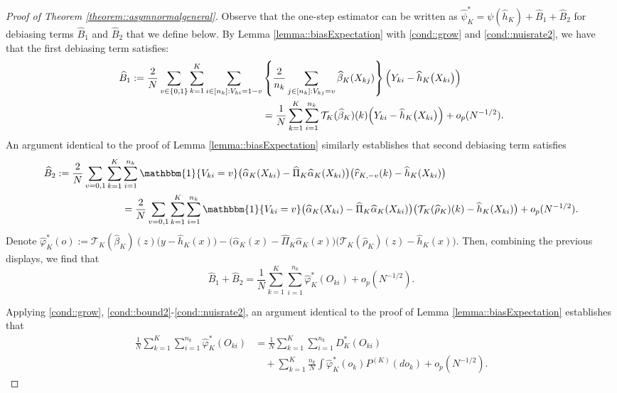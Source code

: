 \documentclass[11pt]{article}
\theoremstyle{plain}
\theoremstyle{definition}
\theoremstyle{remark}
\theoremstyle{definition}
\begin{document}
\begin{proof}[Proof of Theorem  \ref{theorem::asymnormalgeneral}]
 

Observe that the one-step estimator can be written as $\widehat{\psi}_K^* = \psi(\widehat{h}_K) + \widehat{B}_1 + \widehat{B}_2$ for debiasing terms $\widehat{B}_1$ and $\widehat{B}_2$ that we define below. By Lemma \ref{lemma::biasExpectation} with \ref{cond::grow} and \ref{cond::nuisrate2}, we have that the first debiasing term satisfies:
\begin{align*}
        \widehat{B}_1 :=  \frac{2}{N} \sum_{v \in \{0,1\}} \sum_{k=1}^K \sum_{i \in [n_k]: V_{ki} = 1-v} & \left\{\frac{2}{n_k}  \sum_{j \in [n_k]:  V_{kj} = v} \widehat{\beta}_K(X_{kj})\right\}\Bigl(Y_{ki} - \widehat{h}_K\bigl(X_{ki}\bigr)\Bigr)\\
         &=  \frac{1}{N}   \sum_{k=1}^K \sum_{i=1}^{n_k}  \mathcal{T}_{K}(\widehat{\beta}_K)(k) \Bigl(Y_{ki} - \widehat{h}_K\bigl(X_{ki}\bigr)\Bigr) + o_p(N^{-1/2}).
\end{align*} 
An argument identical to the proof of Lemma \ref{lemma::biasExpectation} similarly establishes that second debiasing term satisfies
\begin{align*}
     \widehat{B}_2 :=   \frac{2}{N} \sum_{v=0,1} \sum_{k=1}^K & \sum_{i=1}^{n_k} \mathbbm{1}\{V_{ki} = v\} \bigl(\widehat{\alpha}_K(X_{ki}) - \widehat{\Pi}_K\widehat{\alpha}_K(X_{ki})\bigr) \bigl(\widehat{r}_{K,-v}(k) - \widehat{h}_K(X_{ki})\bigr) \\
    &= \frac{2}{N} \sum_{v=0,1} \sum_{k=1}^K \sum_{i=1}^{n_k} \mathbbm{1}\{V_{ki} = v\} \bigl(\widehat{\alpha}_K(X_{ki}) - \widehat{\Pi}_K\widehat{\alpha}_K(X_{ki})\bigr) \bigl(\mathcal{T}_K(\widehat{\rho}_K)(k) - \widehat{h}_K(X_{ki})\bigr) + o_p(N^{-1/2}).
\end{align*}
Denote $\widehat{\varphi}_K^*(o) :=   \mathcal{T}_K(\widehat{\beta}_K)(z) \big(y - \widehat{h}_K(x)\big)  - \big( \widehat{\alpha}_K(x) - \widehat{\Pi}_{K} \widehat{\alpha}_K(x)\big) \big( \mathcal{T}_K(\widehat{\rho}_K)(z) - \widehat{h}_K(x)\big)$. Then, combining the previous displays, we find that 
$$  \widehat{B}_1  +   \widehat{B}_2  =   \frac{1}{N}   \sum_{k=1}^K \sum_{i=1}^{n_k} \widehat{\varphi}_K^*(O_{ki})  + o_p(N^{-1/2}).$$



Applying \ref{cond::grow}, \ref{cond::bound2}-\ref{cond::nuisrate2}, an argument identical to the proof of Lemma \ref{lemma::biasExpectation} establishes that
  \begin{align*}
      \frac{1}{N}   \sum_{k=1}^K \sum_{i=1}^{n_k} \widehat{\varphi}_K^*(O_{ki})  &=    \frac{1}{N}   \sum_{k=1}^K \sum_{i=1}^{n_k}D_K^*(O_{ki}) \\
      & \quad +  \sum_{k=1}^K  \frac{n_k}{N} \int  \widehat{\varphi}_K^*(o_k)  P^{(K)}(do_k) + o_p(N^{-1/2}).
  \end{align*}  
 


\end{proof}
\end{document}
